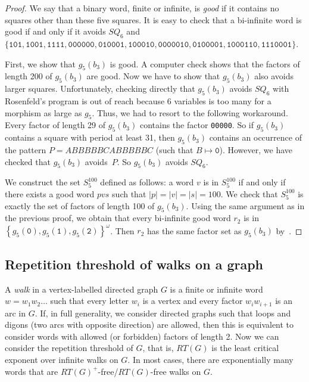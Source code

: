 \documentclass{article}
\def\acc#1{\left\{ #1 \right\}}
\theoremstyle{plain}
\theoremstyle{definition}
\theoremstyle{remark}
\begin{document}
\begin{proof}
We say that a binary word, finite or infinite, is \emph{good} if it contains
no squares other than these five squares.
It is easy to check that a bi-infinite word is good if and only if it avoids $SQ_6$ and\\
$\{\texttt{101},\texttt{1001},\texttt{1111},\texttt{000000},\texttt{010001},
\texttt{100010},\texttt{0000010},\texttt{0100001},\texttt{1000110},\texttt{1110001}\}$.

First, we show that $g_5(b_3)$ is good.
A computer check shows that the factors of length 200 of $g_5(b_3)$ are good.
Now we have to show that $g_5(b_3)$ also avoids larger squares.
Unfortunately, checking directly that $g_5(b_3)$ avoids $SQ_6$ with Rosenfeld's program
is out of reach because 6 variables is too many for a morphism as large as $g_5$.
Thus, we had to resort to the following workaround.
Every factor of length 29 of $g_5(b_3)$ contains the factor \texttt{00000}.
So if $g_5(b_3)$ contains a square with period at least 31, then $g_5(b_3)$ contains an occurrence
of the pattern $P=ABBBBBCABBBBBC$ (such that $B\mapsto\texttt{0}$).
However, we have checked that $g_5(b_3)$ avoids~$P$. So $g_5(b_3)$ avoids $SQ_6$.

We construct the set $S_5^{100}$ defined as follows:
a word $v$ is in $S_5^{100}$ if and only if there exists a good word $pvs$ such that $|p|=|v|=|s|=100$.
We check that $S_5^{100}$ is exactly the set of factors of length 100 of $g_5(b_3)$.
Using the same argument as in the previous proof, we obtain that every bi-infinite good word $r_2$
is in $\acc{g_5(\texttt{0}),g_5(\texttt{1}),g_5(\texttt{2})}^\omega$.
Then $r_2$ has the same factor set as $g_5(b_3)$ by~.
\end{proof}


\subsection{Repetition threshold of walks on a graph}\label{ssec:p5}
A \emph{walk} in a vertex-labelled directed graph $G$ is a finite or infinite word
$w=w_1w_2\ldots$ such that every letter $w_i$ is a vertex and every factor $w_iw_{i+1}$ is an arc in $G$.
If, in full generality, we consider directed graphs such that 
loops and digons (two arcs with opposite direction) are allowed, then this is equivalent 
to consider words with allowed (or forbidden) factors of length 2.
Now we can consider the repetition threshold of $G$, that is, $RT(G)$ is the least critical exponent over infinite walks on $G$.
In most cases, there are exponentially many words that are $RT(G)^+$-free/$RT(G)$-free walks on $G$.
\end{document}
